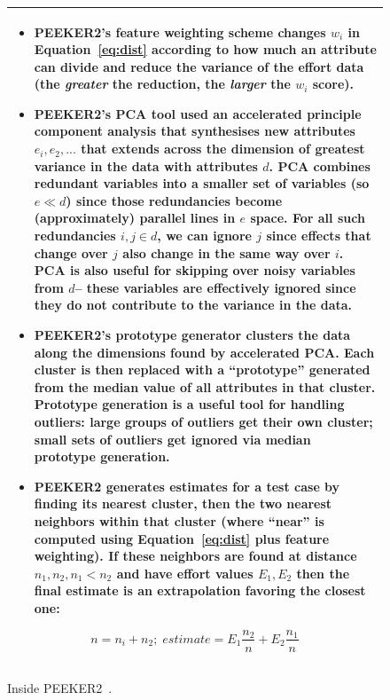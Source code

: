 \documentclass{sig-alternate}
\newcommand{\bi}{\begin{itemize}[leftmargin=0.4cm]}
\newcommand{\ei}{\end{itemize}}
\newcommand{\fig}[1]{Figure~\ref{fig:#1}}
\newcommand{\eq}[1]{Equation~\ref{eq:#1}}
\begin{document}
\begin{figure}[!t]
\small
\begin{tabular}{|p{.95\linewidth}|}\hline
\bi
\item
PEEKER2's feature weighting scheme changes  $w_i$ in \eq{dist}  according to how much an attribute
can divide and reduce the variance of the effort data (the {\em greater} the reduction, the
{\em larger} the $w_i$ score).  
\item
PEEKER2's PCA tool used an accelerated   principle component analysis that synthesises  new
attributes $e_i, e_2,...$
that extends across the dimension of greatest  variance in the data  with attributes $d$.  
PCA  combines
redundant  variables into a smaller set of variables  (so $e \ll d$) since those
redundancies become (approximately) parallel lines
in $e$ space. For all such redundancies \mbox{$i,j \in d$}, we 
can ignore $j$ 
since effects that change over $j$ also
change in the same way over $i$.
PCA is also useful for skipping over noisy variables from $d$-- these
variables are effectively ignored since    they  do not contribute to the variance in the data.
\item
PEEKER2's prototype generator  clusters the data along the dimensions
found by accelerated PCA. Each cluster is then replaced with a ``prototype'' generated from
the median value of all attributes in that cluster. Prototype generation is a useful tool for
handling outliers: large groups of outliers get their own cluster; small sets of outliers
get ignored via median prototype generation.
\item
PEEKER2 generates estimates for a test case by finding its nearest cluster,
then the two nearest neighbors within that cluster  (where ``near''
is computed using \eq{dist} plus feature weighting). If these neighbors are found at distance
$n_1,n_2, n_1 < n_2$ and have effort values $E_1,E_2$ then the final estimate is an extrapolation
favoring the closest one:
\ei
\[
n=n_i+n_2;\;\mathit{estimate}=E_1\frac{n_2}{n} + E_2\frac{n_1}{n}
\]\\\hline
\end{tabular} 
\caption{Inside PEEKER2~\cite{papa13}.}\label{fig:peeker}
\end{figure}




\end{document}
